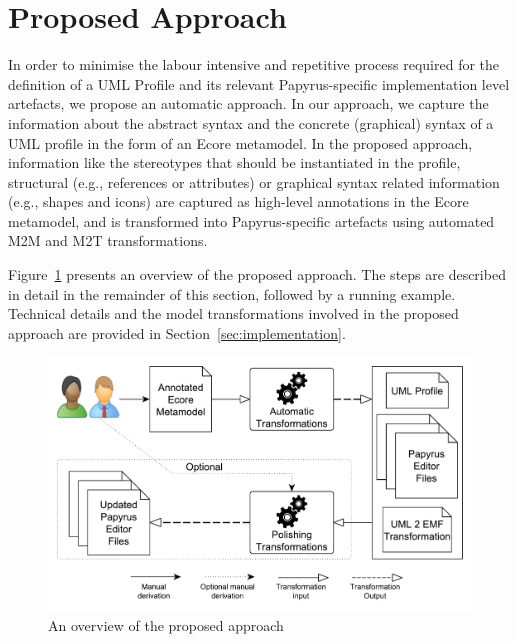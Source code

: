 \section{Proposed Approach}
\label{sec:approach}

In order to minimise the labour intensive and repetitive process required for the definition of a UML Profile and its relevant Papyrus-specific implementation level artefacts, we propose an automatic approach. 
In our approach, we capture the information about the abstract syntax and the concrete (graphical) syntax of a UML profile in the form of an Ecore metamodel.
In the proposed approach, information like the stereotypes that should be instantiated in the profile, structural (e.g., references or attributes) or graphical syntax related information (e.g., shapes and icons) are captured as high-level annotations in the Ecore metamodel, and is transformed into Papyrus-specific artefacts using automated M2M and M2T transformations. 

Figure~\ref{fig:approachOverview} presents an overview of the proposed approach. 
The steps are described in detail in the remainder of this section, followed by a running example. 
Technical details and the model transformations involved in the proposed approach are provided in Section~\ref{sec:implementation}.

\begin{figure}[t]
	\centering
	\includegraphics[width=1\textwidth]{diagrams/approachOverview.pdf}
	\caption[]{An overview of the proposed approach}
	\label{fig:approachOverview}
	\vspace{-6mm}
\end{figure}

